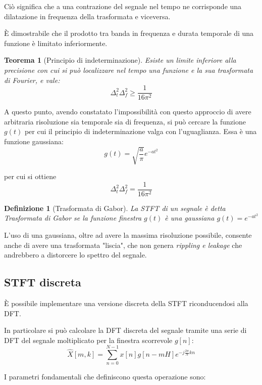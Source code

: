 \documentclass[12pt, a4paper]{article}
\newtheorem*{theorem}{Teorema}
\newtheorem*{definition}{Definizione}
\begin{document}
Ciò significa che a una contrazione del segnale nel tempo ne corrisponde una dilatazione in frequenza della trasformata e viceversa.

È dimostrabile che il prodotto tra banda in frequenza e durata temporale di una funzione è limitato inferiormente.

\begin{theorem}[Principio di indeterminazione]

  Esiste un limite inferiore alla precisione con cui si può localizzare nel tempo una funzione e la sua trasformata di Fourier, e vale:
  \[
    \Delta _t^2 \Delta_f^2 \geq  \frac{1}{16 \pi^2}
  \]
\end{theorem}

A questo punto, avendo constatato l'impossibilità con questo approccio di avere arbitraria risoluzione sia temporale sia di frequenza, si può cercare la funzione $g(t)$ per cui il principio di indeterminazione valga con l'uguaglianza. Essa è una funzione gaussiana:
\[
  g(t) = \sqrt{\frac{a}{\pi}}e^{-at^2}
\]

per cui si ottiene
\[
  \Delta _t^2 \Delta_f^2 = \frac{1}{16 \pi^2}
\]

\begin{definition}[Trasformata di Gabor]

  La STFT di un segnale è detta Trasformata di Gabor se la funzione finestra $g(t)$ è una gaussiana $g(t) = e^{-at^2}$
\end{definition}

L'uso di una gaussiana, oltre ad avere la massima risoluzione possibile, consente anche di avere una trasformata "liscia", che non genera \emph{rippling e leakage} che andrebbero a distorcere lo spettro del segnale.

\subsection{STFT discreta}
È possibile implementare una versione discreta della STFT riconducendosi alla DFT.

In particolare si può calcolare la DFT discreta del segnale tramite una serie di DFT del segnale moltiplicato per la finestra scorrevole $g[n]$:
\[
  \hat{X}[m, k] = \sum_{n=0}^{N-1} x[n] g[n - mH] e^{-j  \frac{2\pi}{N} kn}
\]

I parametri fondamentali che definiscono questa operazione sono:
\end{document}
